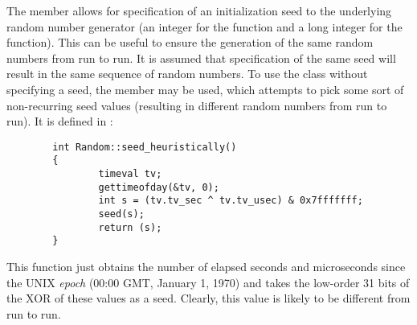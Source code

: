 The  member allows for specification of an initialization
seed to the underlying random number generator (an integer
for the  function and a long integer for the
 function).
This can be useful to ensure the generation of the same random numbers
from run to run.
It is assumed that specification of the same seed will result in the
same sequence of random numbers.
To use the  class without specifying a seed,
the  member may be used, which
attempts to pick some sort of non-recurring seed values (resulting
in different random numbers from run to run).  It is defined
in :
\begin{small}
\begin{verbatim}
        int Random::seed_heuristically()
        {
                timeval tv;
                gettimeofday(&tv, 0);
                int s = (tv.tv_sec ^ tv.tv_usec) & 0x7fffffff;
                seed(s);
                return (s);
        }
\end{verbatim}
\end{small}
This function just obtains the number of elapsed seconds and microseconds
since the UNIX {\em epoch} (00:00 GMT, January 1, 1970) and
takes the low-order 31 bits of the {\sf XOR} of these values as a seed.
Clearly, this value is likely to be different from run to run.

\subsection{}

